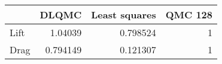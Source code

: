 \begin{tabular}{lrrr}
\toprule
      &    DLQMC &   Least squares &   QMC 128 \\
\midrule
 Lift & 1.04039  &        0.798524 &         1 \\
 Drag & 0.794149 &        0.121307 &         1 \\
\bottomrule
\end{tabular}
